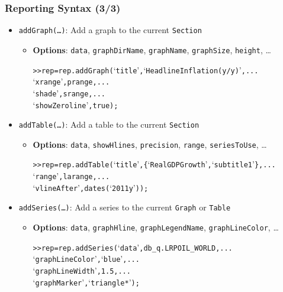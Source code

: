 \documentclass[10pt]{beamer}
\newcommand{\myitem}{\item[$\bullet$]}
\begin{document}
\begin{frame}[fragile,t]
  \frametitle{Reporting Syntax (3/3)}
  \begin{itemize}
    \myitem \texttt{addGraph(\ldots)}: Add a graph to the current \texttt{Section}
    \begin{itemize}
      \myitem \textbf{Options}: \texttt{data}, \texttt{graphDirName}, \texttt{graphName}, \texttt{graphSize}, \texttt{height}, \ldots
      \begin{alltt}
>> rep = rep.addGraph(`title', `Headline Inflation (y/y)', ...
                      `xrange', prange, ...
                      `shade', srange, ...
                      `showZeroline', true);
      \end{alltt}
    \end{itemize}
    \myitem \texttt{addTable(\ldots)}: Add a table to the current \texttt{Section}
    \begin{itemize}
      \myitem \textbf{Options}: \texttt{data}, \texttt{showHlines}, \texttt{precision}, \texttt{range}, \texttt{seriesToUse}, \ldots
      \begin{alltt}
>> rep = rep.addTable(`title', \{`Real GDP Growth',`subtitle 1'\}, ...
                      `range', larange, ...
                      `vlineAfter', dates(`2011y'));
      \end{alltt}
    \end{itemize}
    \myitem \texttt{addSeries(\ldots)}: Add a series to the current \texttt{Graph} or \texttt{Table}
    \begin{itemize}
      \myitem \textbf{Options}: \texttt{data}, \texttt{graphHline}, \texttt{graphLegendName}, \texttt{graphLineColor}, \ldots
      \begin{alltt}
>> rep = rep.addSeries(`data', db\_q.LRPOIL\_WORLD, ...
                       `graphLineColor', `blue', ...
                       `graphLineWidth', 1.5, ...
                       `graphMarker', `triangle*');
      \end{alltt}
    \end{itemize}
  \end{itemize}
\end{frame}
\end{document}
